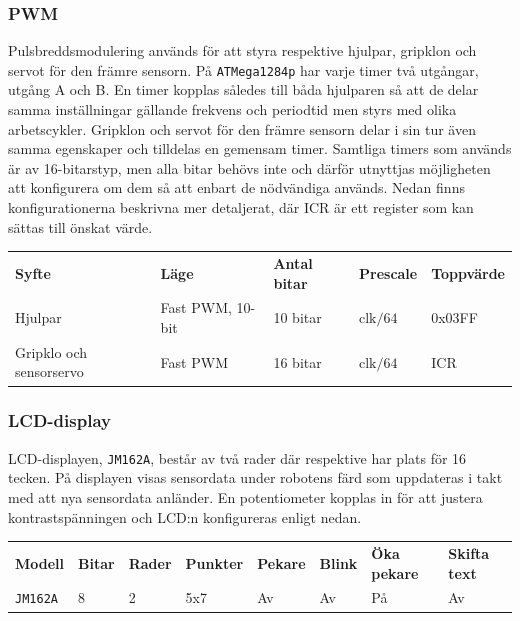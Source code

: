 \documentclass[11pt]{article}
\begin{document}
\begin{flushleft}
\begin{description}[style=unboxed, leftmargin=0cm]
\end{description}


\subsubsection{PWM}
Pulsbreddsmodulering används för att styra respektive hjulpar, gripklon och servot för den främre sensorn. På \verb+ATMega1284p+ har varje timer två utgångar, utgång A och B. En timer kopplas således till båda hjulparen så att de delar samma inställningar gällande frekvens och periodtid men styrs med olika arbetscykler. Gripklon och servot för den främre sensorn delar i sin tur även samma egenskaper och tilldelas en gemensam timer. Samtliga timers som används är av 16-bitarstyp, men alla bitar behövs inte och därför utnyttjas möjligheten att konfigurera om dem så att enbart de nödvändiga används. Nedan finns konfigurationerna beskrivna mer detaljerat, där ICR är ett register som kan sättas till önskat värde.

\begin{center}
\begin{tabular}{l l l l l}

    \textbf{Syfte} & \textbf{Läge} & \textbf{Antal bitar} & \textbf{Prescale} & \textbf{Toppvärde} \\
    Hjulpar & Fast PWM, 10-bit & 10 bitar & $\text{clk}/64$ &  0x03FF \\
	Gripklo och sensorservo & Fast PWM & 16 bitar & $\text{clk}/64$  & ICR \\
\end{tabular}
\end{center}

\subsubsection{LCD-display}
LCD-displayen, \verb+JM162A+, består av två rader där respektive har plats för 16 tecken. På displayen visas sensordata under robotens färd som uppdateras i takt med att nya sensordata anländer. En potentiometer kopplas in för att justera kontrastspänningen och LCD:n konfigureras enligt nedan.

\begin{center}
  \begin{tabular}{l l l l l l l l}
      \textbf{Modell} & \textbf{Bitar} & \textbf{Rader} & \textbf{Punkter} & \textbf{Pekare} & \textbf{Blink} & \textbf{Öka pekare} & \textbf{Skifta text} \\
      \verb+JM162A+ & 8 & 2 & 5x7 & Av & Av & På & Av \\
    \end{tabular}
  \end{center}


\end{flushleft}
\end{document}
